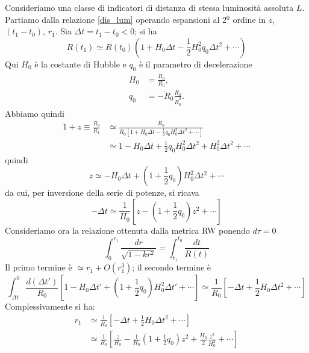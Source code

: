 Consideriamo una classe di indicatori di distanza di stessa luminosità assoluta
$L$. Partiamo dalla relazione \eqref{dis_lum} operando espansioni al 2$^0$
ordine in $z$, $(t_1-t_0)$, $r_1$.  Sia $\Delta t= t_1-t_0 <0$; si ha
\begin{equation}
  R(t_1) \simeq R(t_0) \left( 1+H_0 \Delta t -\frac{1}{2} H^2_0 q_0 \Delta
    t^2+\cdots \right)
\end{equation}
Qui $H_0$ è la costante di Hubble e $q_0$ è il parametro di decelerazione
\begin{subequations}
  \begin{align}
    H_0 &= \frac{{\dot R}_0 }{R_0}, \\
    q_0 &= - {\ddot R}_0 \frac{R_0}{{\dot R}^2_0}.
  \end{align}
\end{subequations}
Abbiamo quindi
\begin{equation}
  \begin{split}
    1+z \equiv \frac{R_0}{R_1} & \simeq \frac{R_0}{R_0 \left[ 1+H_0 \Delta t -
        \frac{1}{2} q_0 H^2_0 \Delta t^2+\cdots\right]} \\
    & \simeq  1- H_0 \Delta t +\frac{1}{2} q_0 H^2_0 \Delta t^2 + H^2_0 \Delta
    t^2+\cdots
  \end{split}
\end{equation}
quindi
\begin{equation}
  z \simeq - H_0 \Delta t +\left( 1+\frac{1}{2} q_0 \right) H^2_0 \Delta t^2
  +\cdots
\end{equation}
da cui, per inversione della serie di potenze, si ricava
\begin{equation}
  -\Delta t \simeq  \frac{1}{H_0} \left[ z - \left( 1 +\frac{1}{2} q_0 \right)
    z^2 +\cdots \right]
\end{equation}
Consideriamo ora la relazione ottenuta dalla metrica RW ponendo $d\tau=0$
\begin{equation}
  \int_0^{r_1} \frac{dr}{\sqrt{1-kr^2}} = \int_{t_1}^{t_0} \frac{dt}{R(t)}
\end{equation}
Il primo termine è $ \simeq r_1 + O(r^3_1)$; il secondo termine è
\begin{equation}
  \int_{\Delta t}^{0} \frac{d(\Delta t')}{R_0} \left[ 1-H_0 \Delta t' + \left(1+
      \frac{1}{2} q_0 \right) H^2_0
    \Delta t' +\cdots \right] \simeq \frac{1}{R_0} \left[ -\Delta t +
    \frac{1}{2} H_0 \Delta t^2+\cdots \right]
\end{equation}
Complessivamente si ha:
\begin{equation}
  \begin{split}
    r_1 & \simeq \frac{1}{R_0} \left[ -\Delta t + \frac{1}{2}H_0 \Delta t^2 + \cdots \right] \\
    & \simeq \frac{1}{R_0} \left[
      \frac{z}{H_0} -
      \frac{1}{H_0} \left(1 + \frac{1}{2} q_0 \right) z^2
      + \frac{H_0}{2} \frac{z^2}{H^2_0} + \cdots \right]
  \end{split}
\end{equation}
